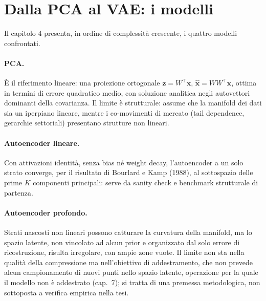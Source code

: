 \section{Dalla PCA al VAE: i modelli}

Il capitolo 4 presenta, in ordine di complessità crescente, i quattro modelli confrontati.

\paragraph{PCA.} È il riferimento lineare: una proiezione ortogonale $\mathbf{z} = W^{\top} \mathbf{x}$, $\hat{\mathbf{x}} = W W^{\top} \mathbf{x}$, ottima in termini di errore quadratico medio, con soluzione analitica negli autovettori dominanti della covarianza. Il limite è strutturale: assume che la manifold dei dati sia un iperpiano lineare, mentre i co-movimenti di mercato (tail dependence, gerarchie settoriali) presentano strutture non lineari.

\paragraph{Autoencoder lineare.} Con attivazioni identità, senza bias né weight decay, l'autoencoder a un solo strato converge, per il risultato di Bourlard e Kamp (1988), al sottospazio delle prime $K$ componenti principali: serve da sanity check e benchmark strutturale di partenza.

\paragraph{Autoencoder profondo.} Strati nascosti non lineari possono catturare la curvatura della manifold, ma lo spazio latente, non vincolato ad alcun prior e organizzato dal solo errore di ricostruzione, risulta irregolare, con ampie zone vuote. Il limite non sta nella qualità della compressione ma nell'obiettivo di addestramento, che non prevede alcun campionamento di nuovi punti nello spazio latente, operazione per la quale il modello non è addestrato (cap.~7); si tratta di una premessa metodologica, non sottoposta a verifica empirica nella tesi.

